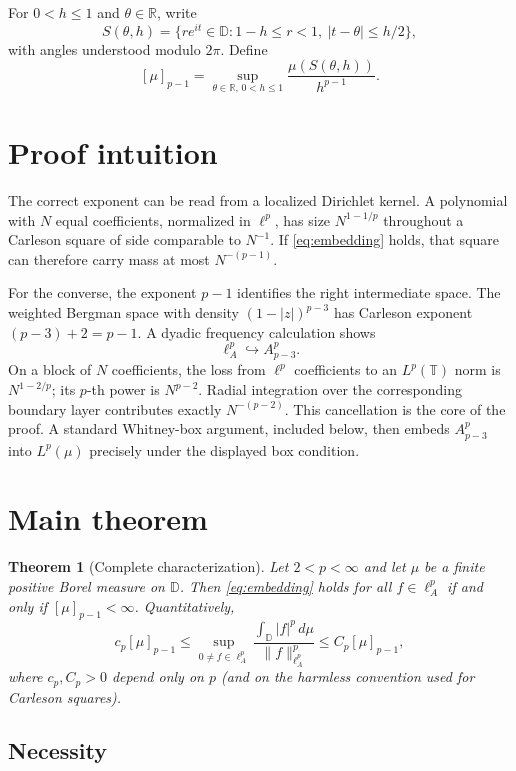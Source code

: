 \documentclass[11pt]{article}
\newtheorem{theorem}{Theorem}
\newcommand{\D}{\mathbb D}
\newcommand{\T}{\mathbb T}
\newcommand{\dd}{\,d}
\begin{document}
For $0<h\leq1$ and $\theta\in\mathbb R$, write
\[
 S(\theta,h)=\{re^{it}\in\D:1-h\leq r<1,
 \ |t-\theta|\leq h/2\},
\]
with angles understood modulo $2\pi$.  Define
\[
 [\mu]_{p-1}=\sup_{\theta\in\mathbb R,\,0<h\leq1}
 \frac{\mu(S(\theta,h))}{h^{p-1}}.
\]

\section{Proof intuition}

The correct exponent can be read from a localized Dirichlet kernel.  A
polynomial with $N$ equal coefficients, normalized in $\ell^p$, has size
$N^{1-1/p}$ throughout a Carleson square of side comparable to $N^{-1}$.
If \eqref{eq:embedding} holds, that square can therefore carry mass at most
$N^{-(p-1)}$.

For the converse, the exponent $p-1$ identifies the right intermediate
space.  The weighted Bergman space with density $(1-|z|)^{p-3}$ has Carleson
exponent $(p-3)+2=p-1$.  A dyadic frequency calculation shows
\[
 \ell_A^p\hookrightarrow A^p_{p-3}.
\]
On a block of $N$ coefficients, the loss from $\ell^p$ coefficients to an
$L^p(\T)$ norm is $N^{1-2/p}$; its $p$-th power is $N^{p-2}$.  Radial
integration over the corresponding boundary layer contributes exactly
$N^{-(p-2)}$.  This cancellation is the core of the proof.  A standard
Whitney-box argument, included below, then embeds $A^p_{p-3}$ into
$L^p(\mu)$ precisely under the displayed box condition.

\section{Main theorem}

\begin{theorem}[Complete characterization]\label{thm:main}
Let $2<p<\infty$ and let $\mu$ be a finite positive Borel measure on $\D$.
Then \eqref{eq:embedding} holds for all $f\in\ell_A^p$ if and only if
$[\mu]_{p-1}<\infty$.  Quantitatively,
\[
 c_p[\mu]_{p-1}
 \leq
 \sup_{0\neq f\in\ell_A^p}
 \frac{\int_{\D}|f|^p\dd\mu}{\|f\|_{\ell_A^p}^p}
 \leq C_p[\mu]_{p-1},
\]
where $c_p,C_p>0$ depend only on $p$ (and on the harmless convention used
for Carleson squares).
\end{theorem}

\subsection*{Necessity}
\end{document}
